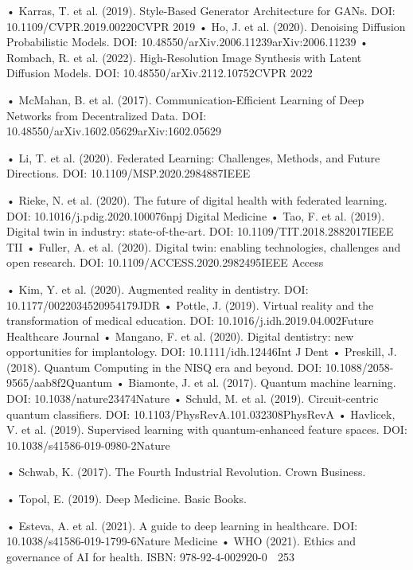     • Karras, T. et al. (2019). Style-Based Generator Architecture for GANs. DOI:
      10.1109/CVPR.2019.00220CVPR 2019
    • Ho, J. et al.  (2020).   Denoising Diffusion Probabilistic Models.             DOI:
      10.48550/arXiv.2006.11239arXiv:2006.11239
    • Rombach, R. et al. (2022). High-Resolution Image Synthesis with Latent Diffusion
      Models. DOI: 10.48550/arXiv.2112.10752CVPR 2022

    • McMahan, B. et al. (2017). Communication-Efficient Learning of Deep Networks
      from Decentralized Data. DOI: 10.48550/arXiv.1602.05629arXiv:1602.05629

    • Li, T. et al. (2020). Federated Learning: Challenges, Methods, and Future
      Directions. DOI: 10.1109/MSP.2020.2984887IEEE

    • Rieke, N. et al. (2020). The future of digital health with federated learning. DOI:
      10.1016/j.pdig.2020.100076npj Digital Medicine
    • Tao, F. et al. (2019). Digital twin in industry:           state-of-the-art.   DOI:
      10.1109/TIT.2018.2882017IEEE TII
    • Fuller, A. et al. (2020). Digital twin: enabling technologies, challenges and open
      research. DOI: 10.1109/ACCESS.2020.2982495IEEE Access

    • Kim, Y. et al.      (2020).             Augmented reality in dentistry.        DOI:
      10.1177/0022034520954179JDR
    • Pottle, J. (2019). Virtual reality and the transformation of medical education. DOI:
      10.1016/j.idh.2019.04.002Future Healthcare Journal
    • Mangano, F. et al. (2020). Digital dentistry: new opportunities for implantology.
      DOI: 10.1111/idh.12446Int J Dent
    • Preskill, J. (2018). Quantum Computing in the NISQ era and beyond. DOI:
      10.1088/2058-9565/aab8f2Quantum
    • Biamonte, J. et al.     (2017).            Quantum machine learning.           DOI:
      10.1038/nature23474Nature
    • Schuld, M. et al.    (2019).  Circuit-centric quantum classifiers.             DOI:
      10.1103/PhysRevA.101.032308PhysRevA
    • Havlicek, V. et al. (2019). Supervised learning with quantum-enhanced feature
      spaces. DOI: 10.1038/s41586-019-0980-2Nature

    • Schwab, K. (2017). The Fourth Industrial Revolution. Crown Business.

    • Topol, E. (2019). Deep Medicine. Basic Books.

    • Esteva, A. et al. (2021). A guide to deep learning in healthcare.              DOI:
      10.1038/s41586-019-1799-6Nature Medicine
    • WHO (2021). Ethics and governance of AI for health. ISBN: 978-92-4-002920-0
                                                                                    253



